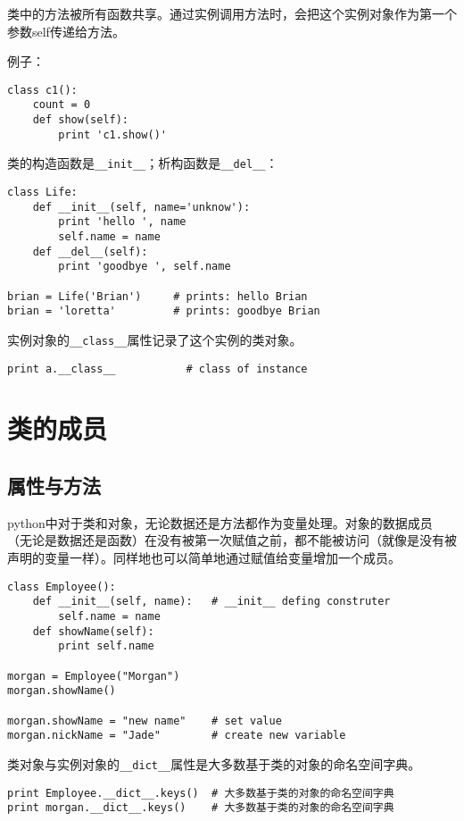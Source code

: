 类中的方法被所有函数共享。通过实例调用方法时，会把这个实例对象作为第一个参数self传递给方法。


例子：

\begin{lstlisting}
class c1():
	count = 0
	def show(self):
		print 'c1.show()'
\end{lstlisting}

类的构造函数是\verb|__init__|；析构函数是\verb|__del__|：

\begin{lstlisting}
class Life:
	def __init__(self, name='unknow'):
		print 'hello ', name
		self.name = name
	def __del__(self):
		print 'goodbye ', self.name

brian = Life('Brian')     # prints: hello Brian
brian = 'loretta'         # prints: goodbye Brian
\end{lstlisting}

		实例对象的\verb|__class__|属性记录了这个实例的类对象。

\begin{lstlisting}
print a.__class__           # class of instance
\end{lstlisting}

\section{类的成员}

\subsection{属性与方法}

python中对于类和对象，无论数据还是方法都作为变量处理。对象的数据成员（无论是数据还是函数）在没有被第一次赋值之前，都不能被访问（就像是没有被声明的变量一样）。同样地也可以简单地通过赋值给变量增加一个成员。

\begin{lstlisting}
class Employee():
	def __init__(self, name):   # __init__ defing construter
		self.name = name
	def showName(self):
		print self.name

morgan = Employee("Morgan")
morgan.showName()

morgan.showName = "new name"    # set value
morgan.nickName = "Jade"        # create new variable
\end{lstlisting}

类对象与实例对象的\verb|__dict__|属性是大多数基于类的对象的命名空间字典。

\begin{lstlisting}
print Employee.__dict__.keys()  # 大多数基于类的对象的命名空间字典
print morgan.__dict__.keys()    # 大多数基于类的对象的命名空间字典
\end{lstlisting}

